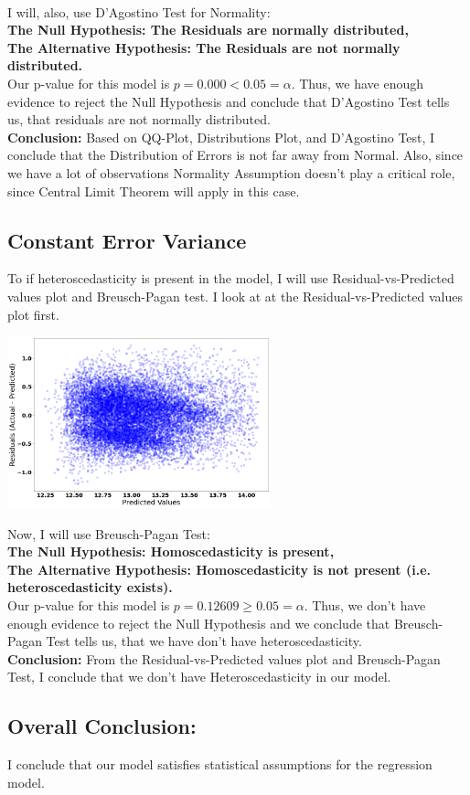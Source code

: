 \documentclass[10pt]{article}
\begin{document}
\\
I will, also, use D'Agostino Test for Normality:\\
\textbf{The Null Hypothesis:  The Residuals are normally distributed,\\
	The Alternative Hypothesis:  The Residuals are not normally distributed.}\\
Our p-value for this model is \(p=0.000 < 0.05 = \alpha\). Thus, we have enough evidence to reject the Null Hypothesis and conclude that D'Agostino Test tells us, that residuals are not normally distributed.\\
\vskip 0.1in
\noindent
\textbf{Conclusion:} Based on QQ-Plot, Distributions Plot, and D'Agostino Test, I conclude that the Distribution of Errors is not far away from Normal. Also, since we have a lot of observations Normality Assumption doesn't play a critical role, since Central Limit Theorem will apply in this case.
\subsection*{Constant Error Variance}
To if heteroscedasticity is present in the model, I will use Residual-vs-Predicted values plot and Breusch-Pagan test.
I look at at the Residual-vs-Predicted values plot first.
\begin{center}
	\includegraphics[width=3in]{residual_plot_linear_model}
\end{center}
Now, I will use Breusch-Pagan Test:\\
\textbf{The Null Hypothesis:  Homoscedasticity is present,\\
	The Alternative Hypothesis:  Homoscedasticity is not present (i.e. heteroscedasticity exists).}\\
Our p-value for this model is \(p=0.12609 \ge 0.05 = \alpha\). Thus, we don't have enough evidence to reject the Null Hypothesis and we conclude that Breusch-Pagan Test  tells us, that we have don't have heteroscedasticity.\\
\textbf{Conclusion:} From the Residual-vs-Predicted values plot and  Breusch-Pagan Test, I conclude that we don't have Heteroscedasticity in our model.
\subsection*{Overall Conclusion:} I conclude that our model satisfies statistical assumptions for the regression model.
\end{document}
